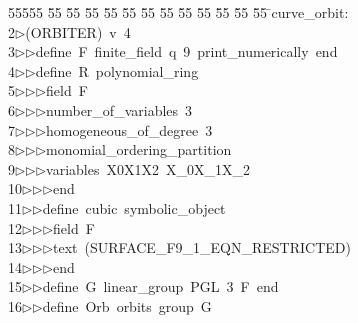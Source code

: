 %
%
\begin{tabbing}
55555 \= 55 \= 55 \= 55 \= 55 \= 55 \= 55 \= 55 \= 55 \= 55 \= 55 \= 55 \= 55 \= \>curve\_orbit:\\[0pt]
2\>$\triangleright$\>(ORBITER)\ v\ 4\ \\[0pt]
3\>$\triangleright$\>$\triangleright$\>define\ F\ finite\_field\ q\ 9\ print\_numerically\ end\ \\[0pt]
4\>$\triangleright$\>$\triangleright$\>define\ R\ polynomial\_ring\ \\[0pt]
5\>$\triangleright$\>$\triangleright$\>$\triangleright$\>field\ F\ \\[0pt]
6\>$\triangleright$\>$\triangleright$\>$\triangleright$\>number\_of\_variables\ 3\ \\[0pt]
7\>$\triangleright$\>$\triangleright$\>$\triangleright$\>homogeneous\_of\_degree\ 3\ \\[0pt]
8\>$\triangleright$\>$\triangleright$\>$\triangleright$\>monomial\_ordering\_partition\ \\[0pt]
9\>$\triangleright$\>$\triangleright$\>$\triangleright$\>variables\ X0X1X2\ X\_0X\_1X\_2\ \\[0pt]
10\>$\triangleright$\>$\triangleright$\>$\triangleright$\>end\ \\[0pt]
11\>$\triangleright$\>$\triangleright$\>define\ cubic\ symbolic\_object\ \\[0pt]
12\>$\triangleright$\>$\triangleright$\>$\triangleright$\>field\ F\ \\[0pt]
13\>$\triangleright$\>$\triangleright$\>$\triangleright$\>text\ (SURFACE\_F9\_1\_EQN\_RESTRICTED)\ \\[0pt]
14\>$\triangleright$\>$\triangleright$\>$\triangleright$\>end\ \\[0pt]
15\>$\triangleright$\>$\triangleright$\>define\ G\ linear\_group\ PGL\ 3\ F\ end\ \\[0pt]
16\>$\triangleright$\>$\triangleright$\>define\ Orb\ orbits\ group\ G\ \\[0pt]

\end{tabbing}
